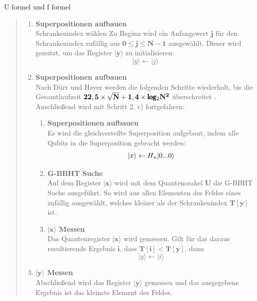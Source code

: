 U formel und f formel
\begin{quote}
    \begin{enumerate}
        \item \textbf{Superpositionen aufbauen}
        \\
        Schrankenindex wählen
        Zu Beginn wird ein Anfangswert $\mathbf{j}$ für den Schrankenindex zufällig aus $\mathbf{0 \leq j \leq N-1}$ ausgewählt. Dieser wird genutzt, um das Register $\mathbf{|y\rangle}$ zu initialisieren: 
        \begin{equation}
            |y\rangle \leftarrow |j\rangle
        \end{equation}
        \item \textbf{Superpositionen aufbauen}
        \\
        Nach Dürr und Høyer werden die folgenden Schritte wiederholt, bis die Gesamtlaufzeit $\mathbf{22,5 \times \sqrt{N} + 1,4 \times \pmb\log\textsubscript{2}N^2}$ überschreitet \cite[S. 141]{Ho96}. 
        Anschließend wird mit Schritt 2. c) fortgefahren:
        \\
        \begin{enumerate}
            \item \textbf{Superpositionen aufbauen}
            \\
            Es wird die gleichverteilte Superposition aufgebaut, indem alle Qubits in die Superposition gebracht werden:
            \begin{equation}
                |x\rangle \leftarrow H\textsubscript{n}|0 ... 0 \rangle
            \end{equation}
            \item \textbf{G-BBHT Suche}
            \\
            Auf dem Register $\mathbf{|x\rangle}$ wird mit dem Quantenorakel $\mathbf{U}$ die G-BBHT Suche ausgeführt. 
            So wird aus allen Elementen des Feldes eines zufällig ausgewählt, welches kleiner als der Schrankenindex $\mathbf{T[y]}$ ist.
            \item \textbf{$\mathbf{|x\rangle}$ Messen}
            \\
            Das Quantenregister $\mathbf{|x\rangle}$ wird gemessen. 
            Gilt für das daraus resultierende Ergebnis $\mathbf{i}$, dass $\mathbf{T[i] < T[y]}$, dann 
            \begin{equation}
                |y\rangle \leftarrow |i\rangle
            \end{equation}
        \end{enumerate}

        \item \textbf{$\mathbf{|y\rangle}$ Messen}
        \\
        Abschließend wird das Register $\mathbf{|y\rangle}$ gemessen und das ausgegebene Ergebnis ist das kleinste Element des Feldes.
    \end{enumerate}
\end{quote}

